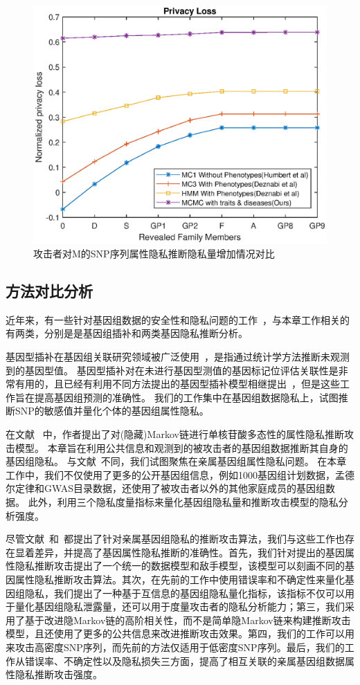 \begin{figure}[htbp]
	\centering
	\includegraphics[width=0.8\linewidth]{./figures/Mprivacyloss.eps}
	\centering
	\caption{攻击者对M的SNP序列属性隐私推断隐私量增加情况对比}\label{fig:Mprivacyloss}
\end{figure}

\subsection{方法对比分析}

近年来，有一些针对基因组数据的安全性和隐私问题的工作~\cite{hubaux2017genomic}，与本章工作相关的有两类，分别是是基因组插补和两类基因隐私推断分析。

基因型插补在基因组关联研究领域被广泛使用~\cite{marchini2007newa}，是指通过统计学方法推断未观测到的基因型值。 基因型插补对在未进行基因型测值的基因标记位评估关联性是非常有用的，且已经有利用不同方法提出的基因型插补模型相继提出~\cite{howie2009flexible,marchini2007newa,howie2014impute2}，但是这些工作旨在提高基因组预测的准确性。 我们的工作集中在基因组数据隐私上，试图推断SNP的敏感值并量化个体的基因组属性隐私。


在文献~\cite{samani2015quantifying} 中，作者提出了对(隐藏)Markov链进行单核苷酸多态性的属性隐私推断攻击模型。 本章旨在利用公共信息和观测到的被攻击者的基因组数据推断其自身的基因组隐私。 与文献~\cite{samani2015quantifying}不同，我们试图聚焦在亲属基因组属性隐私问题。 在本章工作中，我们不仅使用了更多的公开基因组信息，例如1000基因组计划数据，孟德尔定律和GWAS目录数据，还使用了被攻击者以外的其他家庭成员的基因组数据。 此外，利用三个隐私度量指标来量化基因组隐私量和推断攻击模型的隐私分析强度。

尽管文献~\cite{humbert2013addressing,humbert2017quantifying}和~\cite{deznabi2018inference}都提出了针对亲属基因组隐私的推断攻击算法，我们与这些工作也存在显着差异，并提高了基因属性隐私推断的准确性。首先，我们针对提出的基因属性隐私推断攻击提出了一个统一的数据模型和敌手模型，该模型可以刻画不同的基因属性隐私推断攻击算法。其次，在先前的工作中使用错误率和不确定性来量化基因组隐私，我们提出了一种基于互信息的基因组隐私量化指标，该指标不仅可以用于量化基因组隐私泄露量，还可以用于度量攻击者的隐私分析能力；第三，我们采用了基于改进隐Markov链的高阶相关性，而不是简单隐Markov链来构建推断攻击模型，且还使用了更多的公共信息来改进推断攻击效果。第四，我们的工作可以用来攻击高密度SNP序列，而先前的方法仅适用于低密度SNP序列。最后，我们的工作从错误率、不确定性以及隐私损失三方面，提高了相互关联的亲属基因组数据属性隐私推断攻击强度。

